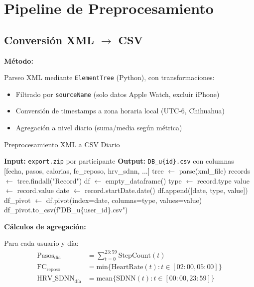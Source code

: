\documentclass[12pt,letterpaper,twoside]{report}
\begin{document}
\section{Pipeline de Preprocesamiento}

\subsection{Conversión XML $\to$ CSV}

\begin{estadisticobox}
\textbf{Método:}

Parseo XML mediante \texttt{ElementTree} (Python), con transformaciones:
\begin{itemize}[noitemsep]
    \item Filtrado por \texttt{sourceName} (solo datos Apple Watch, excluir iPhone)
    \item Conversión de timestamps a zona horaria local (UTC-6, Chihuahua)
    \item Agregación a nivel diario (suma/media según métrica)
\end{itemize}
\end{estadisticobox}

\begin{algorithm}[H]
\caption{Preprocesamiento XML a CSV Diario}
\label{alg:xml_to_csv}
\begin{algorithmic}[1]
\State \textbf{Input:} \texttt{export.zip} por participante
\State \textbf{Output:} \texttt{DB\_u\{id\}.csv} con columnas [fecha, pasos, calorias, fc\_reposo, hrv\_sdnn, ...]
\State
{}
    \State tree $\gets$ parse(xml\_file)
    \State records $\gets$ tree.findall("Record")
    \State df $\gets$ empty\_dataframe()
            \State type $\gets$ record.type
            \State value $\gets$ record.value
            \State date $\gets$ record.startDate.date()
            \State df.append([date, type, value])
        \EndIf
    \EndFor
    \State df\_pivot $\gets$ df.pivot(index=date, columns=type, values=value)
    \State df\_pivot.to\_csv(f"DB\_u\{user\_id\}.csv")
\EndProcedure
\end{algorithmic}
\end{algorithm}

\begin{calculobox}
\textbf{Cálculos de agregación:}

Para cada usuario y día:
\begin{align}
\text{Pasos}_{\text{día}} &= \sum_{t=0}^{23:59} \text{StepCount}(t) \\
\text{FC}_{\text{reposo}} &= \text{min}\{\text{HeartRate}(t) : t \in [02:00, 05:00]\} \\
\text{HRV\_SDNN}_{\text{día}} &= \text{mean}\{\text{SDNN}(t) : t \in [00:00, 23:59]\}
\end{align}
\end{calculobox}
\end{document}
